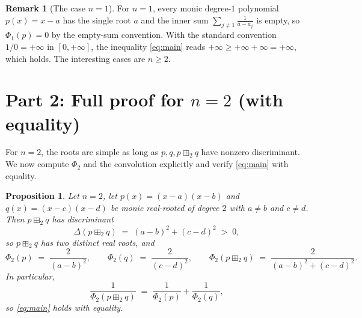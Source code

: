 \documentclass[12pt]{article}
\newtheorem{proposition}[theorem]{Proposition}
\theoremstyle{definition}
\newtheorem{remark}[theorem]{Remark}
\begin{document}
\begin{remark}[The case $n=1$]
For $n=1$, every monic degree-$1$ polynomial $p(x)=x-a$ has the single root $a$ and the inner sum $\sum_{j\neq 1}\frac{1}{a-a_j}$ is empty, so $\Phi_1(p)=0$ by the empty-sum convention. With the standard convention $1/0=+\infty$ in $[0,+\infty]$, the inequality \eqref{eq:main} reads $+\infty\geq+\infty+\infty=+\infty$, which holds. The interesting cases are $n\geq 2$.
\end{remark}

\section{Part 2: Full proof for $n=2$ (with equality)}

For $n=2$, the roots are simple as long as $p,q,p\boxplus_2 q$ have nonzero discriminant. We now compute $\Phi_2$ and the convolution explicitly and verify \eqref{eq:main} with equality.

\begin{proposition}\label{prop:n2}
Let $n=2$, let $p(x)=(x-a)(x-b)$ and $q(x)=(x-c)(x-d)$ be monic real-rooted of degree $2$ with $a\neq b$ and $c\neq d$. Then $p\boxplus_2 q$ has discriminant
\begin{equation}\label{eq:disc}
\Delta(p\boxplus_2 q) \;=\; (a-b)^2+(c-d)^2 \;>\; 0,
\end{equation}
so $p\boxplus_2 q$ has two distinct real roots, and
\begin{equation}\label{eq:phi2}
\Phi_2(p) \;=\; \frac{2}{(a-b)^2},\qquad
\Phi_2(q) \;=\; \frac{2}{(c-d)^2},\qquad
\Phi_2(p\boxplus_2 q) \;=\; \frac{2}{(a-b)^2+(c-d)^2}.
\end{equation}
In particular,
\begin{equation}\label{eq:n2eq}
\frac{1}{\Phi_2(p\boxplus_2 q)} \;=\; \frac{1}{\Phi_2(p)}+\frac{1}{\Phi_2(q)},
\end{equation}
so \eqref{eq:main} holds with equality.
\end{proposition}
\end{document}
